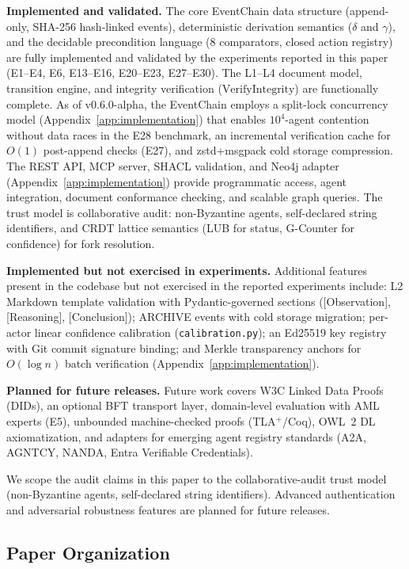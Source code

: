 \textbf{Implemented and validated.} The core EventChain data structure (append-only, SHA-256 hash-linked events), deterministic derivation semantics ($\delta$ and $\gamma$), and the decidable precondition language (8 comparators, closed action registry) are fully implemented and validated by the experiments reported in this paper (E1--E4, E6, E13--E16, E20--E23, E27--E30). The L1--L4 document model, transition engine, and integrity verification ($\text{VerifyIntegrity}$) are functionally complete. As of v0.6.0-alpha, the EventChain employs a split-lock concurrency model (Appendix~\ref{app:implementation}) that enables $10^{4}$-agent contention without data races in the E28 benchmark, an incremental verification cache for $O(1)$ post-append checks (E27), and zstd+msgpack cold storage compression. The REST API, MCP server, SHACL validation, and Neo4j adapter (Appendix~\ref{app:implementation}) provide programmatic access, agent integration, document conformance checking, and scalable graph queries. The trust model is collaborative audit: non-Byzantine agents, self-declared string identifiers, and CRDT lattice semantics (LUB for status, G-Counter for confidence) for fork resolution.

\textbf{Implemented but not exercised in experiments.} Additional features present in the codebase but not exercised in the reported experiments include: L2 Markdown template validation with Pydantic-governed sections ([Observation], [Reasoning], [Conclusion]); \textsc{ARCHIVE} events with cold storage migration; per-actor linear confidence calibration (\texttt{calibration.py}); an Ed25519 key registry with Git commit signature binding; and Merkle transparency anchors for $O(\log n)$ batch verification (Appendix~\ref{app:implementation}).

\textbf{Planned for future releases.} Future work covers W3C Linked Data Proofs (DIDs), an optional BFT transport layer, domain-level evaluation with AML experts (E5), unbounded machine-checked proofs (TLA$^{+}$/Coq), OWL~2 DL axiomatization, and adapters for emerging agent registry standards (A2A, AGNTCY, NANDA, Entra Verifiable Credentials).\par
We scope the audit claims in this paper to the collaborative-audit trust model (non-Byzantine agents, self-declared string identifiers). Advanced authentication and adversarial robustness features are planned for future releases.

\subsection{Paper Organization}\label{subsec:organization}

